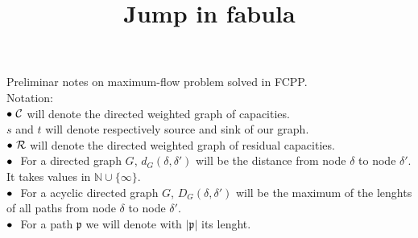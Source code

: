 \documentclass{article}
\title{Jump in fabula}
\author{}
\date{}
\theoremstyle{plain}
\theoremstyle{definition}
\theoremstyle{remark}
\begin{document}
Preliminar notes on maximum-flow problem solved in FCPP.\\
Notation:\\
 $\small\bullet\ \mathcal{C}$ will denote the directed weighted graph of capacities.\\
 $s$ and $t$ will denote respectively source and sink of our graph.\\
 $\small\bullet\ \mathcal{R}$ will denote the directed weighted graph of residual capacities.\\
 $\small\bullet\ $ For a directed graph $G$, $d_G(\delta, \delta')$ will be the distance from node $\delta$ to node $\delta'$. It takes values in $\mathbb{N}\cup\{\infty \}$.\\
 $\small\bullet\ $ For a acyclic directed graph $G$, $D_G(\delta, \delta')$ will be the maximum of the lenghts of all paths from node $\delta$ to node $\delta'$.\\
 $\small\bullet\ $  For a path $\mathfrak{p}$ we will denote with $|\mathfrak{p}|$ its lenght.\\
\end{document}
